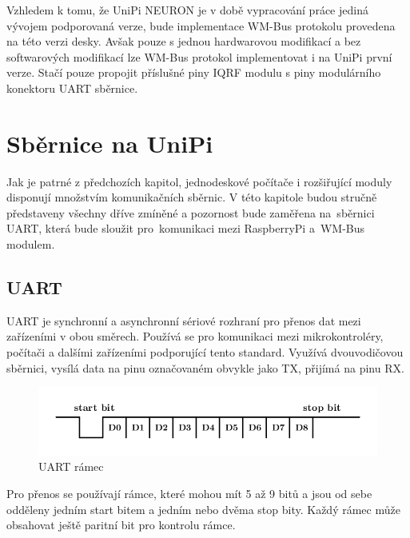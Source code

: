 \vspace{10pt}
Vzhledem k tomu, že UniPi NEURON je v době vypracování práce jediná vývojem podporovaná verze, bude implementace WM-Bus protokolu provedena na této verzi desky. Avšak pouze s jednou hardwarovou modifikací a bez softwarových modifikací lze WM-Bus protokol implementovat i na UniPi první verze. Stačí pouze propojit příslušné piny IQRF modulu s piny modulárního konektoru UART sběrnice.



\section{Sběrnice na UniPi}
Jak je patrné z předchozích kapitol, jednodeskové počítače i rozšiřující moduly disponují množstvím komunikačních sběrnic. V této kapitole budou stručně představeny všechny dříve zmíněné a pozornost bude zaměřena na~sběrnici UART, která bude sloužit pro~komunikaci mezi RaspberryPi a~WM-Bus modulem.

\subsection{UART}
UART je synchronní a asynchronní sériové rozhraní pro přenos dat mezi zařízeními v obou směrech. Používá se pro komunikaci mezi mikrokontroléry, počítači a dalšími zařízeními podporující tento standard. Využívá dvouvodičovou sběrnici, vysílá data na pinu označovaném obvykle jako TX, přijímá na pinu RX.

 \begin{figure}[!ht]
	\vspace{-10pt}
  \begin{center}
    \includegraphics[scale=1.0]{obrazky/sbernice_uart}
  \end{center}
	\vspace{-30pt}
  \caption{UART rámec}
	\vspace{-5pt}
\end{figure}
Pro přenos se používají rámce, které mohou mít 5 až 9 bitů a jsou od sebe odděleny jedním start bitem a jedním nebo dvěma stop bity. Každý rámec může obsahovat ještě paritní bit pro kontrolu rámce. 

